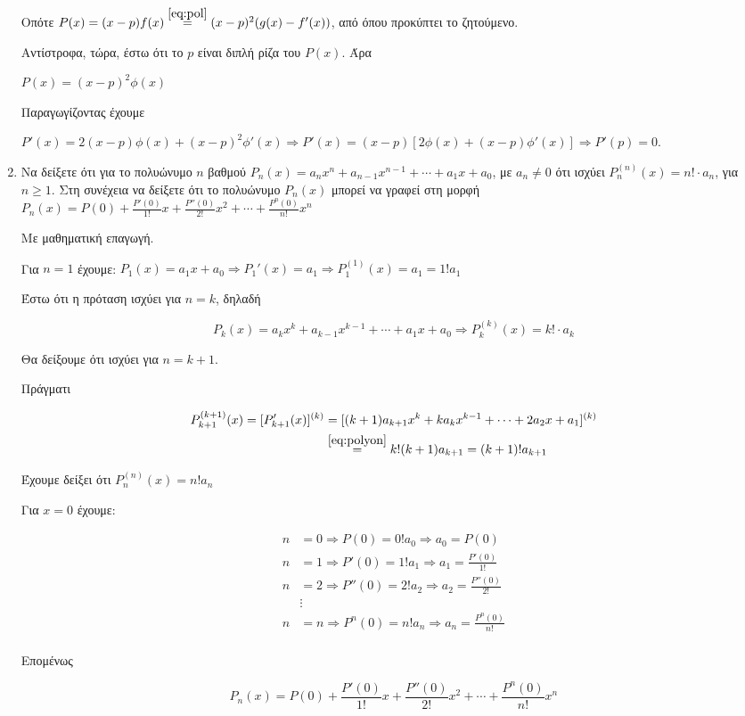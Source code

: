 \begin{enumerate}
			Οπότε $ P(x) = (x-p)f(x) \overset{\eqref{eq:pol}}{=} (x-p)^{2}(g(x)
			- f'(x)) $, από όπου προκύπτει το ζητούμενο.

			Αντίστροφα, τώρα, έστω ότι το $p$ είναι διπλή ρίζα του $ P(x) $. Άρα 

			$ P(x) = (x-p)^{2}\phi(x) $

			Παραγωγίζοντας έχουμε

			$ P'(x) = 2(x-p)\phi(x) + (x-p)^{2}\phi'(x) \Rightarrow P'(x) =
			(x-p)[2\phi(x) + (x-p)\phi'(x)] \Rightarrow P'(p) = 0 $.





		\item Να δείξετε ότι για το πολυώνυμο $n$ βαθμού $ P_{n}(x) =a_{n}x^{n} +
		a_{n-1}x^{n-1} + \cdots + a_{1}x + a_{0} $, με  $ a_{n}\neq 0 $ ότι ισχύει $
		P_{n}^{(n)}(x) = n! \cdot a_{n}$, για  $n\geq 1 $. Στη συνέχεια να
		δείξετε ότι το πολυώνυμο $ P_{n}(x) $ μπορεί να γραφεί στη μορφή $ P_{n}(x) =
		P(0) + \frac{P'(0)}{1!} x + \frac{P''(0)}{2!} x^{2} + \cdots +
		\frac{P^{n}(0)}{n!} x^{n} $ 





		Με μαθηματική επαγωγή.

		Για $ n=1 $ έχουμε: $ P_{1}(x) = a_{1}x + a_{0} \Rightarrow P_{1}'(x) =
		a_{1} \Rightarrow P_{1}^{(1)}(x)
		= a_{1} = 1!a_{1} $ 

		Έστω ότι η πρόταση ισχύει για $ n = k  $, δηλαδή

		\begin{equation}\label{eq:polyon}
			P_{k}(x) = a_{k}x^{k} + a_{k-1}x^{k-1}+ \cdots +a_{1}x + a_{0}
			\Rightarrow P_{k}^{(k)}(x) = k!\cdot a_{k}
		\end{equation}

		Θα δείξουμε ότι ισχύει για $ n = k+1 $.

		Πράγματι

		\begin{align*}
			P_{k+1}^{(k+1)}(x) = [P_{k+1}'(x)]^{(k)} 
			&= [(k+1)a_{k+1}x^{k} +	ka_{k}x^{k-1} + \cdots + 2a_{2}x + a_{1}]^{(k)} \\
			&\overset{\eqref{eq:polyon}}{=} k! (k+1) a_{k+1} = (k+1)!a_{k+1}
		\end{align*}	

		Έχουμε δείξει ότι $ P_{n}^{(n)}(x) = n! a_{n} $

		Για $ x = 0 $ έχουμε:

		\begin{align*}
			n &= 0 \Rightarrow P(0) = 0!a_{0} \Rightarrow a_{0} = P(0) \\
			n &= 1 \Rightarrow P'(0) = 1!a_{1} \Rightarrow a_{1} = \frac{P'(0)}{1!} \\ 
			n &= 2 \Rightarrow P''(0) = 2!a_{2} \Rightarrow a_{2} = \frac{P''(0)}{2!} \\
			  &\vdots \\
			n &= n \Rightarrow P^{n}(0) = n!a_{n} \Rightarrow a_{n} = \frac{P^{n}(0)}{n!} \\
		\end{align*}	

		Επομένως 

		\[
			P_{n}(x) = P(0) + \frac{P'(0)}{1!} x + \frac{P''(0)}{2!} x^{2} + \cdots
			+ \frac{P^{n}(0)}{n!} x^{n}
		\]
\end{enumerate}


